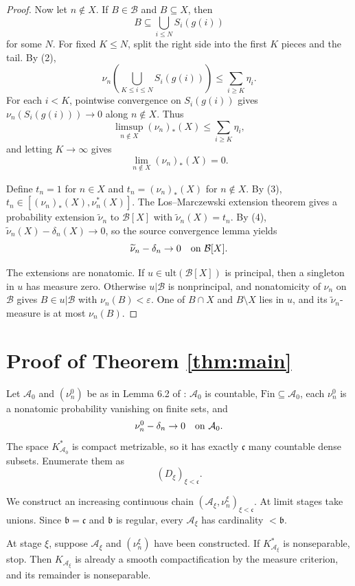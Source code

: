 \documentclass[11pt]{amsart}
\theoremstyle{definition}
\newcommand{\A}{\mathcal A}
\newcommand{\B}{\mathcal B}
\newcommand{\Fin}{\mathrm{Fin}}
\newcommand{\ult}{\mathrm{ult}}
\newcommand{\bc}{\mathfrak c}
\newcommand{\bb}{\mathfrak b}
\begin{document}
\begin{proof}
Now let \(n\notin X\).  If \(B\in\B\) and \(B\subseteq X\), then
\[
        B\subseteq\bigcup_{i\le N}S_i(g(i))
\]
for some \(N\).  For fixed \(K\le N\), split the right side into the first
\(K\) pieces and the tail.  By (2),
\[
        \nu_n\!\left(\bigcup_{K\le i\le N}S_i(g(i))\right)
        \le \sum_{i\ge K}\eta_i .
\]
For each \(i<K\), pointwise convergence on \(S_i(g(i))\) gives
\(\nu_n(S_i(g(i)))\to0\) along \(n\notin X\).  Thus
\[
        \limsup_{n\notin X}(\nu_n)_*(X)\le \sum_{i\ge K}\eta_i,
\]
and letting \(K\to\infty\) gives
\[
        \lim_{n\notin X}(\nu_n)_*(X)=0.                     \tag{4}
\]

Define \(t_n=1\) for \(n\in X\) and \(t_n=(\nu_n)_*(X)\) for \(n\notin X\).
By (3), \(t_n\in[(\nu_n)_*(X),\nu_n^*(X)]\).  The Los--Marczewski extension
theorem gives a probability extension \(\widetilde\nu_n\) to \(\B[X]\) with
\(\widetilde\nu_n(X)=t_n\).  By (4),
\(\widetilde\nu_n(X)-\delta_n(X)\to0\), so the source convergence lemma
\cite[Lemma 3.3]{DP2016} yields
\[
        \widetilde\nu_n-\delta_n\to0
        \quad\hbox{on }\B[X].
\]

The extensions are nonatomic.  If \(u\in\ult(\B[X])\) is principal, then a
singleton in \(u\) has measure zero.  Otherwise \(u|\B\) is nonprincipal, and
nonatomicity of \(\nu_n\) on \(\B\) gives \(B\in u|\B\) with
\(\nu_n(B)<\varepsilon\).  One of \(B\cap X\) and \(B\setminus X\) lies in
\(u\), and its \(\widetilde\nu_n\)-measure is at most \(\nu_n(B)\).
\end{proof}

\section*{Proof of Theorem \ref{thm:main}}

Let \(\A_0\) and \((\nu_n^0)\) be as in Lemma 6.2 of \cite{DP2016}: \(\A_0\)
is countable, \(\Fin\subseteq\A_0\), each \(\nu_n^0\) is a nonatomic
probability vanishing on finite sets, and
\[
        \nu_n^0-\delta_n\to0
        \quad\hbox{on }\A_0 .
\]
The space \(K_{\A_0}^*\) is compact metrizable, so it has exactly \(\bc\) many
countable dense subsets.  Enumerate them as
\[
        (D_\xi)_{\xi<\bc}.
\]

We construct an increasing continuous chain
\((\A_\xi,\nu_n^\xi)_{\xi<\bc}\).  At limit stages take unions.  Since
\(\bb=\bc\) and \(\bb\) is regular, every \(\A_\xi\) has cardinality
\(<\bb\).

At stage \(\xi\), suppose \(\A_\xi\) and \((\nu_n^\xi)\) have been constructed.
If \(K_{\A_\xi}^*\) is nonseparable, stop.  Then \(K_{\A_\xi}\) is already a
smooth compactification by the measure criterion, and its remainder is
nonseparable.
\end{document}

